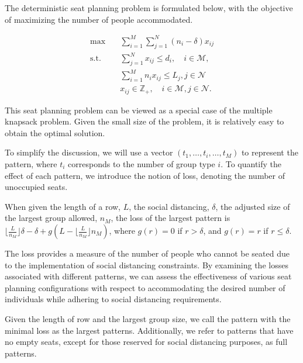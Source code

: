 The deterministic seat planning problem is formulated below, with the objective of maximizing the number of people accommodated.

\begin{equation}\label{deter_upper}
  \begin{aligned}
  \max \quad & \sum_{i=1}^{M}  \sum_{j= 1}^{N} (n_i- \delta) x_{ij} \\
  \text {s.t.} \quad & \sum_{j= 1}^{N} x_{ij} \leq d_{i}, \quad i \in \mathcal{M}, \\
  & \sum_{i=1}^{M} n_{i} x_{ij} \leq L_j, j \in \mathcal{N} \\
  & x_{ij} \in \mathbb{Z}_{+}, \quad i \in \mathcal{M}, j \in \mathcal{N}.
  \end{aligned}
\end{equation}

This seat planning problem can be viewed as a special case of the multiple knapsack problem. Given the small size of the problem, it is relatively easy to obtain the optimal solution.

To simplify the discussion, we will use a vector $(t_1, \ldots, t_i, \ldots, t_M)$ to represent the pattern, where $t_i$ corresponds to the number of group type $i$. To quantify the effect of each pattern, we introduce the notion of loss, denoting the number of unoccupied seats. 

\begin{lem}\label{lem_pattern}
When given the length of a row, $L$, the social distancing, $\delta$, the adjusted size of the largest group allowed, $n_M$, the loss of the largest pattern is $\lfloor \frac{L}{n_M} \rfloor \delta - \delta + g(L - \lfloor \frac{L}{n_M} \rfloor n_M)$, where $g(r)=0$ if $r> \delta$, and $g(r)= r$ if $r \leq \delta$.
\end{lem}

The loss provides a measure of the number of people who cannot be seated due to the implementation of social distancing constraints. By examining the losses associated with different patterns, we can assess the effectiveness of various seat planning configurations with respect to accommodating the desired number of individuals while adhering to social distancing requirements.

\begin{definition}
Given the length of row and the largest group size, we call the pattern with the minimal loss as the largest patterns. Additionally, we refer to patterns that have no empty seats, except for those reserved for social distancing purposes, as full patterns.
\end{definition}

